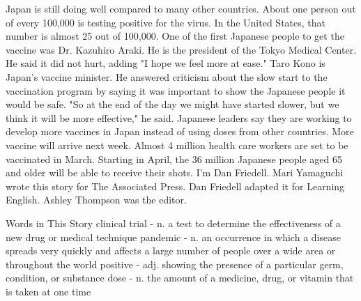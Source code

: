 Japan is still doing well compared to many other countries. About one person out of every 100,000 is testing positive for the virus. In the United States, that number is almost 25 out of 100,000.
One of the first Japanese people to get the vaccine was Dr. Kazuhiro Araki. He is the president of the Tokyo Medical Center.
He said it did not hurt, adding "I hope we feel more at ease."
Taro Kono is Japan's vaccine minister. He answered criticism about the slow start to the vaccination program by saying it was important to show the Japanese people it would be safe.
"So at the end of the day we might have started slower, but we think it will be more effective," he said.
Japanese leaders say they are working to develop more vaccines in Japan instead of using doses from other countries. More vaccine will arrive next week.
Almost 4 million health care workers are set to be vaccinated in March. Starting in April, the 36 million Japanese people aged 65 and older will be able to receive their shots.
I'm Dan Friedell.
Mari Yamaguchi wrote this story for The Associated Press. Dan Friedell adapted it for Learning English. Ashley Thompson was the editor.

\begin{messagebox}
Words in This Story
clinical trial - n. a test to determine the effectiveness of a new drug or medical technique
pandemic - n. an occurrence in which a disease spreads very quickly and affects a large number of people over a wide area or throughout the world
positive - adj. showing the presence of a particular germ, condition, or substance
dose - n. the amount of a medicine, drug, or vitamin that is taken at one time
\end{messagebox}

